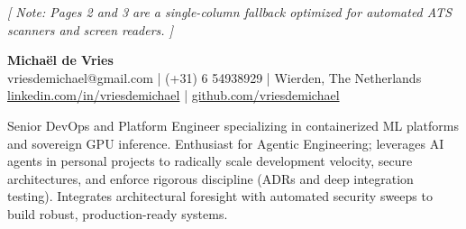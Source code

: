 \documentclass[a4paper]{deedy-resume} %
\begin{document}
\begin{center}
  \fontsize{9pt}{12pt}\selectfont
  \textit{\color{gray}[ Note: Pages 2 and 3 are a single-column fallback optimized for automated ATS scanners and screen readers. ]}
\end{center}
\vspace{10pt}

\begin{center}
  {\fontsize{22pt}{26pt}\selectfont\textbf{Michaël de Vries}} \\
  \vspace{6pt}
  {\fontsize{10pt}{14pt}\selectfont
  vriesdemichael@gmail.com | (+31) 6 54938929 | Wierden, The Netherlands \\
  \href{https://www.linkedin.com/in/vriesdemichael}{linkedin.com/in/vriesdemichael} | \href{https://github.com/vriesdemichael}{github.com/vriesdemichael}
  }
\end{center}
\vspace{10pt}

Senior DevOps and Platform Engineer specializing in containerized ML platforms and sovereign GPU inference. Enthusiast for Agentic Engineering; leverages AI agents in personal projects to radically scale development velocity, secure architectures, and enforce rigorous discipline (ADRs and deep integration testing). Integrates architectural foresight with automated security sweeps to build robust, production-ready systems.

\end{document}
